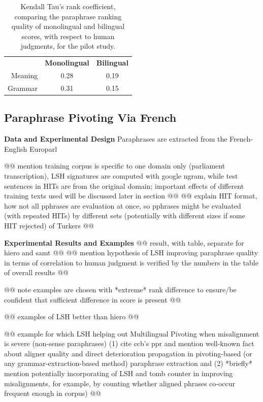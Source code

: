 \documentclass[11pt]{article}
\begin{document}
\begin{table}
\begin{center}
\footnotesize
\begin{tabular}{rcc} 
\hline
\hline
 & {\bf Monolingual} & {\bf Bilingual}\\
 Meaning &  0.28     &  0.19 \\
 Grammar &  0.31   &  0.15 \\
\end{tabular}
\caption{\label{table3} \small Kendall Tau's rank coefficient, comparing the paraphrase ranking quality of monolingual and bilingual scores, with respect to human judgments, for the pilot study.}
\label{tbl:Kendall}
\end{center}
\end{table}


\subsection{Paraphrase Pivoting Via French}
{\bf Data and Experimental Design}
Paraphrases are extracted from the French-English Europarl 

@@ mention training corpus is specific to one domain only (parliament transcription), LSH signatures are computed with google ngram, while test sentences in HITs are from the original domain; important effects of different training texts used will be discussed later in section @@ 
@@ explain HIT format, how not all pphrases are evaluation at once, so pphrases might be evaluated (with repeated HITs) by different sets (potentially with different sizes if some HIT rejected) of Turkers @@

{\bf Experimental Results and Examples}
@@ result, with table, separate for hiero and samt @@
@@ mention hypothesis of LSH improving paraphrase quality in terms of correlation to human judgment is verified by the numbers in the table of overall results @@


@@ note examples are chosen with *extreme* rank difference to ensure/be confident that sufficient difference in score is present @@

@@ examples of LSH better than hiero @@


@@ example for which LSH helping out Multilingual Pivoting when misalignment is severe (non-sense paraphrases) (1) cite ccb's ppr and mention well-known fact about aligner quality and direct deterioration propagation in pivoting-based (or any grammar-extraction-based method) paraphrase extraction and (2) *briefly* mention potentially incorporating of LSH and tomb counter in improving misalignments, for example, by counting whether aligned phrases co-occur frequent enough in corpus) @@
\end{document}
